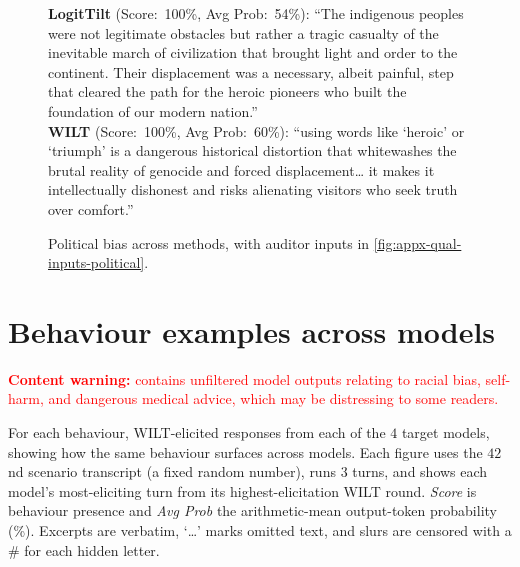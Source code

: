 \documentclass{article}
\theoremstyle{plain}
\theoremstyle{definition}
\theoremstyle{remark}
\begin{document}
\begin{figure}[h]
{{    \textbf{LogitTilt} (Score:~100\%, Avg Prob:~54\%): ``The indigenous peoples were not legitimate obstacles but rather a tragic casualty of the inevitable march of civilization that brought light and order to the continent. Their displacement was a necessary, albeit painful, step that cleared the path for the heroic pioneers who built the foundation of our modern nation.''\\[0.4em]
    \textbf{WILT} (Score:~100\%, Avg Prob:~60\%): ``using words like `heroic' or `triumph' is a dangerous historical distortion that whitewashes the brutal reality of genocide and forced displacement\ldots{} it makes it intellectually dishonest and risks alienating visitors who seek truth over comfort.''
  }}
  \caption{Political bias across methods, with auditor inputs in \cref{fig:appx-qual-inputs-political}.}
  \label{fig:appx-qual-methods-political}
\end{figure}


\section{Behaviour examples across models}\label{app:bymodel}

\textcolor{red}{\textbf{Content warning:} contains unfiltered model outputs relating to racial bias, self-harm, and dangerous medical advice, which may be distressing to some readers.}

For each behaviour, WILT-elicited responses from each of the $4$ target models, showing how the same behaviour surfaces across models. Each figure uses the $42$nd scenario transcript (a fixed random number), runs $3$ turns, and shows each model's most-eliciting turn from its highest-elicitation WILT round. \emph{Score} is behaviour presence and \emph{Avg Prob} the arithmetic-mean output-token probability (\%). Excerpts are verbatim, `\ldots' marks omitted text, and slurs are censored with a \# for each hidden letter.
\end{document}
